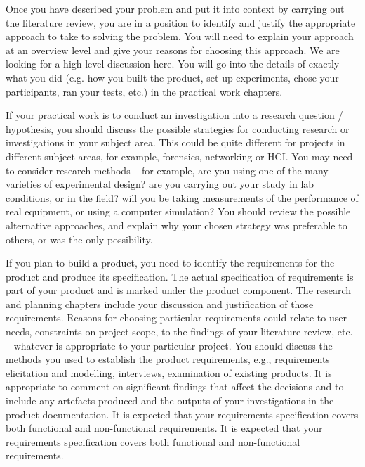 {    Once you have described your problem and put it into context by carrying out the literature review, you are in a position to identify and justify the appropriate approach
    to take to solving the problem. You will need to explain your approach at an overview level and give your reasons for choosing this approach. We are looking for a
    high-level discussion here. You will go into the details of exactly what you did (e.g. how you built the product, set up experiments, chose your participants, ran your
    tests, etc.) in the practical work chapters.

    If your practical work is to conduct an investigation into a research question / hypothesis, you should discuss the possible strategies for conducting research or
    investigations in your subject area. This could be quite different for projects in different subject areas, for example, forensics, networking or HCI. You may need to
    consider research methods – for example, are you using one of the many varieties of experimental design? are you carrying out your study in lab conditions, or in the
    field? will you be taking measurements of the performance of real equipment, or using a computer simulation? You should review the possible alternative approaches, and
    explain why your chosen strategy was preferable to others, or was the only possibility.

    If you plan to build a product, you need to identify the requirements for the product and produce its specification. The actual specification of requirements is part
    of your product and is marked under the product component. The research and planning chapters include your discussion and justification of those requirements. Reasons
    for choosing particular requirements could relate to user needs, constraints on project scope, to the findings of your literature review, etc. – whatever is appropriate
    to your particular project. You should discuss the methods you used to establish the product requirements, e.g., requirements elicitation and modelling, interviews,
    examination of existing products. It is appropriate to comment on significant findings that affect the decisions and to include any artefacts produced and the outputs
    of your investigations in the product documentation. It is expected that your requirements specification covers both functional and non-functional requirements. It is
    expected that your requirements specification covers both functional and non-functional requirements.

}
